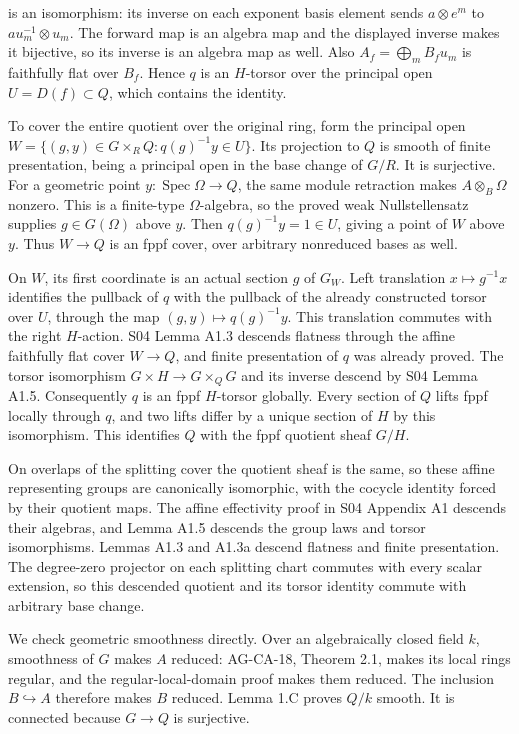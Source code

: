 \documentclass[11pt,a4paper,openany]{report}
\begin{document}
is an isomorphism: its inverse on each exponent basis element sends \(a\otimes e^m\) to \(a u_m^{-1}\otimes u_m\). The forward map is an algebra map and the displayed inverse makes it bijective, so its inverse is an algebra map as well. Also \(A_f=\bigoplus_m B_f u_m\) is faithfully flat over \(B_f\). Hence \(q\) is an \(H\)-torsor over the principal open \(U=D(f)\subset Q\), which contains the identity.

To cover the entire quotient over the original ring, form the principal open \(W=\{(g,y)\in G\times_R Q:q(g)^{-1}y\in U\}\). Its projection to \(Q\) is smooth of finite presentation, being a principal open in the base change of \(G/R\). It is surjective. For a geometric point \(y:\operatorname{Spec}\Omega\to Q\), the same module retraction makes \(A\otimes_B\Omega\) nonzero. This is a finite-type \(\Omega\)-algebra, so the proved weak Nullstellensatz supplies \(g\in G(\Omega)\) above \(y\). Then \(q(g)^{-1}y=1\in U\), giving a point of \(W\) above \(y\). Thus \(W\to Q\) is an fppf cover, over arbitrary nonreduced bases as well.

On \(W\), its first coordinate is an actual section \(g\) of \(G_W\). Left translation \(x\mapsto g^{-1}x\) identifies the pullback of \(q\) with the pullback of the already constructed torsor over \(U\), through the map \((g,y)\mapsto q(g)^{-1}y\). This translation commutes with the right \(H\)-action. S04 Lemma A1.3 descends flatness through the affine faithfully flat cover \(W\to Q\), and finite presentation of \(q\) was already proved. The torsor isomorphism \(G\times H\to G\times_QG\) and its inverse descend by S04 Lemma A1.5. Consequently \(q\) is an fppf \(H\)-torsor globally. Every section of \(Q\) lifts fppf locally through \(q\), and two lifts differ by a unique section of \(H\) by this isomorphism. This identifies \(Q\) with the fppf quotient sheaf \(G/H\).

On overlaps of the splitting cover the quotient sheaf is the same, so these affine representing groups are canonically isomorphic, with the cocycle identity forced by their quotient maps. The affine effectivity proof in S04 Appendix A1 descends their algebras, and Lemma A1.5 descends the group laws and torsor isomorphisms. Lemmas A1.3 and A1.3a descend flatness and finite presentation. The degree-zero projector on each splitting chart commutes with every scalar extension, so this descended quotient and its torsor identity commute with arbitrary base change.

We check geometric smoothness directly. Over an algebraically closed field \(k\), smoothness of \(G\) makes \(A\) reduced: AG-CA-18, Theorem 2.1, makes its local rings regular, and the regular-local-domain proof makes them reduced. The inclusion \(B\hookrightarrow A\) therefore makes \(B\) reduced. Lemma 1.C proves \(Q/k\) smooth. It is connected because \(G\to Q\) is surjective.
\end{document}
